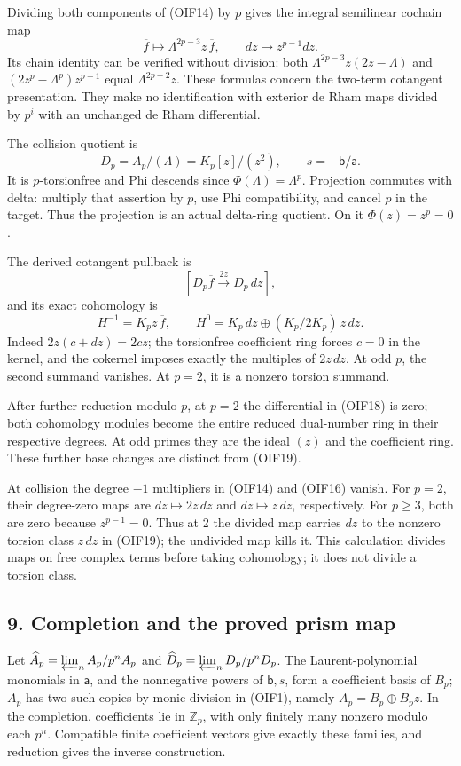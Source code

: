 \documentclass[
]{article}
\begin{document}
Dividing both components of (OIF14) by \(p\) gives the integral
semilinear cochain map \[
\overline f\mapsto\Lambda^{2p-3}z\,\overline f,\qquad
dz\mapsto z^{p-1}dz.
\tag{OIF16}
\] Its chain identity can be verified without division: both
\(\Lambda^{2p-3}z(2z-\Lambda)\) and \((2z^p-\Lambda^p)z^{p-1}\) equal
\(\Lambda^{2p-2}z\). These formulas concern the two-term cotangent
presentation. They make no identification with exterior de Rham maps
divided by \(p^i\) with an unchanged de Rham differential.

The collision quotient is \[
D_p=A_p/(\Lambda)=K_p[z]/(z^2),\qquad
s=-\mathsf b/\mathsf a.
\tag{OIF17}
\] It is \(p\)-torsionfree and Phi descends since
\(\Phi(\Lambda)=\Lambda^p\). Projection commutes with delta: multiply
that assertion by \(p\), use Phi compatibility, and cancel \(p\) in the
target. Thus the projection is an actual delta-ring quotient. On it
\(\Phi(z)=z^p=0\).

The derived cotangent pullback is \[
[D_p\overline f\xrightarrow{\,2z\,}D_p\,dz],
\tag{OIF18}
\] and its exact cohomology is \[
H^{-1}=K_pz\,\overline f,\qquad
H^0=K_p\,dz\oplus(K_p/2K_p)\,z\,dz.
\tag{OIF19}
\] Indeed \(2z(c+dz)=2cz\); the torsionfree coefficient ring forces
\(c=0\) in the kernel, and the cokernel imposes exactly the multiples of
\(2z\,dz\). At odd \(p\), the second summand vanishes. At \(p=2\), it is
a nonzero torsion summand.

After further reduction modulo \(p\), at \(p=2\) the differential in
(OIF18) is zero; both cohomology modules become the entire reduced
dual-number ring in their respective degrees. At odd primes they are the
ideal \((z)\) and the coefficient ring. These further base changes are
distinct from (OIF19).

At collision the degree \(-1\) multipliers in (OIF14) and (OIF16)
vanish. For \(p=2\), their degree-zero maps are \(dz\mapsto2z\,dz\) and
\(dz\mapsto z\,dz\), respectively. For \(p\ge3\), both are zero because
\(z^{p-1}=0\). Thus at 2 the divided map carries \(dz\) to the nonzero
torsion class \(z\,dz\) in (OIF19); the undivided map kills it. This
calculation divides maps on free complex terms before taking cohomology;
it does not divide a torsion class.

\subsection{9. Completion and the proved prism
map}\label{completion-and-the-proved-prism-map}

Let \(\widehat A_p=\varprojlim_nA_p/p^nA_p\) and
\(\widehat D_p=\varprojlim_nD_p/p^nD_p\). The Laurent-polynomial
monomials in \(\mathsf a\), and the nonnegative powers of
\(\mathsf b,s\), form a coefficient basis of \(B_p\); \(A_p\) has two
such copies by monic division in (OIF1), namely \(A_p=B_p\oplus B_pz\).
In the completion, coefficients lie in \(\mathbb Z_p\), with only
finitely many nonzero modulo each \(p^n\). Compatible finite coefficient
vectors give exactly these families, and reduction gives the inverse
construction.
\end{document}
